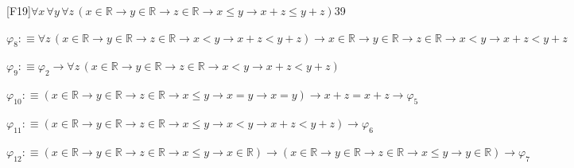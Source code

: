 \begin{fullproof}{[F19]}{$\forall x\,\forall y\,\forall z\,(x \in \mathbb{R} \to y \in \mathbb{R} \to z \in \mathbb{R} \to x \leq y \to x + z \leq y + z)$}{39}
\begin{abbrevlist}
\item $\varphi_{8} :\equiv \forall z\,(x \in \mathbb{R} \to y \in \mathbb{R} \to z \in \mathbb{R} \to x < y \to x + z < y + z) \to x \in \mathbb{R} \to y \in \mathbb{R} \to z \in \mathbb{R} \to x < y \to x + z < y + z$
\item $\varphi_{9} :\equiv \varphi_{2} \to \forall z\,(x \in \mathbb{R} \to y \in \mathbb{R} \to z \in \mathbb{R} \to x < y \to x + z < y + z)$
\item $\varphi_{10} :\equiv (x \in \mathbb{R} \to y \in \mathbb{R} \to z \in \mathbb{R} \to x \leq y \to x = y \to x = y) \to x + z = x + z \to \varphi_{5}$
\item $\varphi_{11} :\equiv (x \in \mathbb{R} \to y \in \mathbb{R} \to z \in \mathbb{R} \to x \leq y \to x < y \to x + z < y + z) \to \varphi_{6}$
\item $\varphi_{12} :\equiv (x \in \mathbb{R} \to y \in \mathbb{R} \to z \in \mathbb{R} \to x \leq y \to x \in \mathbb{R}) \to (x \in \mathbb{R} \to y \in \mathbb{R} \to z \in \mathbb{R} \to x \leq y \to y \in \mathbb{R}) \to \varphi_{7}$
\end{abbrevlist}
\end{fullproof}
